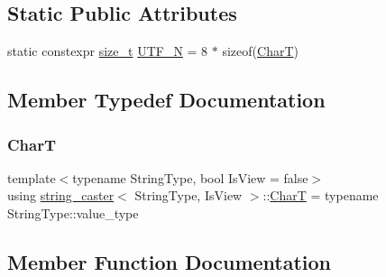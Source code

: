 \subsection*{Static Public Attributes}
\begin{DoxyCompactItemize}
\item 
static constexpr \mbox{\hyperlink{detail_2common_8h_a801d6a451a01953ef8cbae6feb6a3638}{size\+\_\+t}} \mbox{\hyperlink{structstring__caster_a1d6a90921b8dd893b6feecfa98859d28}{U\+T\+F\+\_\+N}} = 8 $\ast$ sizeof(\mbox{\hyperlink{structstring__caster_a0d5228e9253c85b930b6230662f2f60c}{CharT}})
\end{DoxyCompactItemize}


\subsection{Member Typedef Documentation}
\mbox{\label{structstring__caster_a0d5228e9253c85b930b6230662f2f60c}} 
\subsubsection{\texorpdfstring{CharT}{CharT}}
{\footnotesize\ttfamily template$<$typename String\+Type, bool Is\+View = false$>$ \\
using \mbox{\hyperlink{structstring__caster}{string\+\_\+caster}}$<$ String\+Type, Is\+View $>$\+::\mbox{\hyperlink{structstring__caster_a0d5228e9253c85b930b6230662f2f60c}{CharT}} =  typename String\+Type\+::value\+\_\+type}



\subsection{Member Function Documentation}
\mbox{\label{structstring__caster_aac6f059b620b6ada6aed354b9c3f0b56}} 
